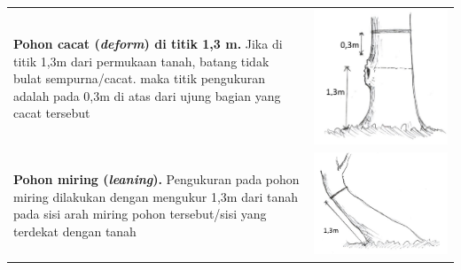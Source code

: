\documentclass[
]{book}
\begin{document}
\begin{longtable}[]{@{}
  >{\raggedright\arraybackslash}p{}
  >{\raggedright\arraybackslash}p{}@{}}
\textbf{Pohon cacat (\emph{deform}) di titik 1,3 m.} Jika di titik 1,3m dari permukaan tanah, batang tidak bulat sempurna/cacat. maka titik pengukuran adalah pada 0,3m di atas dari ujung bagian yang cacat tersebut & \includegraphics{images/vtb2.jpg} \\
\textbf{Pohon miring (\emph{leaning}).} Pengukuran pada pohon miring dilakukan dengan mengukur 1,3m dari tanah pada sisi arah miring pohon tersebut/sisi yang terdekat dengan tanah & \includegraphics{images/vtb3.jpg} \\

\end{longtable}
\end{document}
